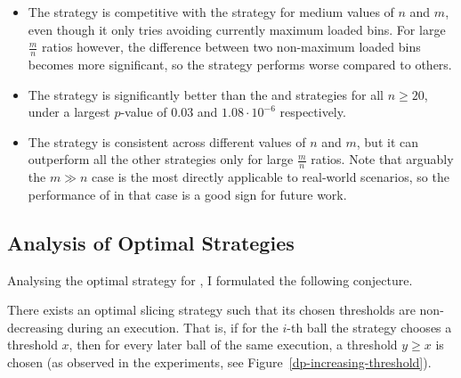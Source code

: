 \begin{itemize}
    \item The \LocalRewardOptimiser strategy is competitive with the \DP strategy for medium values of $n$ and $m$, even though it only tries avoiding currently maximum loaded bins. For large $\frac{m}{n}$ ratios however, the difference between two non-maximum loaded bins becomes more significant, so the strategy performs worse compared to others.
    \item The \DQN strategy is significantly better than the \MeanThinning and \Threshold strategies for all $n\geq 20$, under a largest $p$-value of $0.03$ and $1.08\cdot 10^{-6}$ respectively.
    \item The \DQN strategy is consistent across different values of $n$ and $m$, but it can outperform all the other strategies only for large $\frac{m}{n}$ ratios. Note that arguably the $m\gg n$ case is the most directly applicable to real-world scenarios, so the performance of \DQL in that case is a good sign for future work.
\end{itemize}


\subsection{Analysis of Optimal Strategies}

Analysing the optimal \DP strategy for \TwoThinning, I formulated the following conjecture.

\begin{conjecture}\label{conjecture: two-thinning-increasing-threshold}
There exists an optimal slicing strategy such that its chosen thresholds are non-decreasing during an execution. That is, if for the $i$-th ball the strategy chooses a threshold $x$, then for every later ball of the same execution, a threshold $y\geq x$ is chosen (as observed in the experiments, see Figure~\ref{dp-increasing-threshold}).
\end{conjecture}


